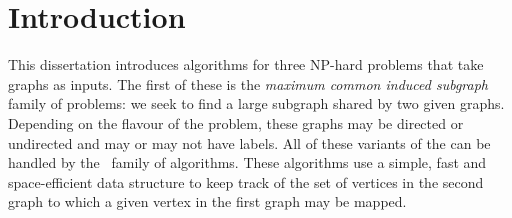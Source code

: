 \chapter{Introduction}
\label{c:intro}

\newcommand{\FourQueens}[2] {
  \begin{tikzpicture}[scale=0.6, every node/.style={black,scale=0.9}]
    \newcommand*{\xMin}{0}%
    \newcommand*{\xMax}{3}%
    \newcommand*{\yMin}{0}%
    \newcommand*{\yMax}{3}%
    \foreach \i / \label in {0/a,1/b,2/c,3/d} {
        \draw [] node at (\i+.5,\yMin-.3) {$\label$};
    }
    \foreach \i / \label in {0/1,1/2,2/3,3/4} {
        \draw [] node at (\xMin-.3,\i+.5) {$\label$};
    }

    \foreach \y in {0,2}{
        \foreach \x in {0,2}{
            \fill[black!8] (\x,\y) rectangle (1+\x,1+\y) rectangle (2+\x,2+\y);}}
    \draw [step=1.0] (0,0) grid (4,4);
    \foreach \x/\y/\m in {#2}
        \draw [] node at (\x,\y) {\m};
    \node[draw,circle,inner sep=1mm] at (-1.4,3.5) {#1};
  \end{tikzpicture}
}

\newcommand{\MCSDomains}[2] {
  \begin{tikzpicture}[scale=0.6, every node/.style={black,scale=0.9}]
    \newcommand*{\xMin}{0}%
    \newcommand*{\xMax}{5}%
    \newcommand*{\yMin}{0}%
    \newcommand*{\yMax}{4}%
    \foreach \i / \label in {0/a,1/b,2/c,3/d,4/e,5/f} {
        \draw [] node at (\i+.5,\yMax+1.4) {$\label$};
    }
    \foreach \i / \label in {4/1,3/2,2/3,1/4,0/5} {
        \draw [] node at (\xMin-.3,\i+.5) {$\label$};
    }

    \draw [step=1.0] (0,0) grid (6,5);
    \foreach \x/\y/\m in {#2}
        \draw [] node at (\x,\y) {\m};
    \node[draw,circle,inner sep=1mm] at (-1.4,3.5) {#1};
  \end{tikzpicture}
}

This dissertation introduces algorithms for three NP-hard problems that
take graphs as inputs.  The first of these is the \emph{maximum common induced subgraph}
family of problems: we seek to find a large subgraph shared by two given graphs.
Depending on the flavour of the problem, these
graphs may be directed or undirected and may or may not have labels.
All of these variants of the can be handled by the \McSplit\ family of algorithms.
These algorithms use a simple, fast and space-efficient data structure to keep
track of the set of vertices in the second graph to which a given vertex
in the first graph may be mapped.

